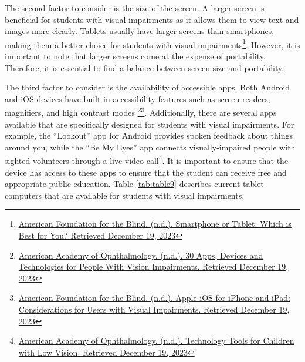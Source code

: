 The second factor to consider is the size of the screen. A larger screen is beneficial for students with visual impairments as it allows them to view text and images more clearly. Tablets usually have larger screens than smartphones, making them a better choice for students with visual impairments\footnote{\raggedright \href{https://www.afb.org/blindness-and-low-vision/using-technology/cell-phones-tablets-mobile/smartphone-or-tablet-which}{American Foundation for the Blind. (n.d.). Smartphone or Tablet: Which is Best for You? Retrieved December 19, 2023}}. However, it is important to note that larger screens come at the expense of portability. Therefore, it is essential to find a balance between screen size and portability.

The third factor to consider is the availability of accessible apps. Both Android and iOS devices have built-in accessibility features such as screen readers, magnifiers, and high contrast modes \footnote{\raggedright \href{https://www.aao.org/eye-health/tips-prevention/low-vision-impairment-apps-tech-assistive-devices }{American Academy of Ophthalmology. (n.d.). 30 Apps, Devices and Technologies for People With Vision Impairments. Retrieved December 19, 2023}}\fnsep\footnote{\raggedright \href{https://www.afb.org/blindness-and-low-vision/using-technology/cell-phones-tablets-mobile/apple-ios-iphone-and-ipad }{American Foundation for the Blind. (n.d.). Apple iOS for iPhone and iPad: Considerations for Users with Visual Impairments. Retrieved December 19, 2023}}. Additionally, there are several apps available that are specifically designed for students with visual impairments. For example, the “Lookout” app for Android provides spoken feedback about things around you, while the “Be My Eyes” app connects visually-impaired people with sighted volunteers through a live video call\footnote{\raggedright \href{https://www.aao.org/eye-health/tips-prevention/technology-apps-devices-children-blind-low-vision}{American Academy of Ophthalmology. (n.d.). Technology Tools for Children with Low Vision. Retrieved December 19, 2023}}. It is important to ensure that the device has access to these apps to ensure that the student can receive free and appropriate public education.
Table \ref{tab:table9} describes current tablet computers that are available for students with visual impairments.

\pagebreak 
 

